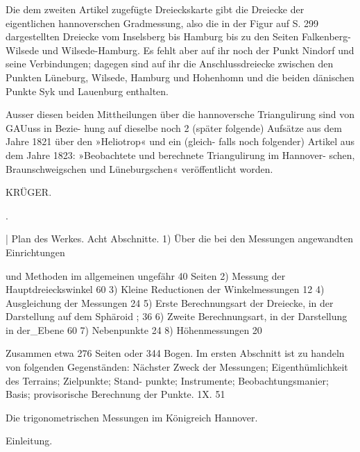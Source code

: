 \documentclass[12pt,a4paper]{article}
\theoremstyle{plain}
\theoremstyle{definition}
\theoremstyle{remark}
\begin{document}
\noindent
Die dem zweiten Artikel zugefügte Dreieckskarte gibt die Dreiecke der eigentlichen hannoverschen
Gradmessung, also die in der Figur auf S. 299 dargestellten Dreiecke vom Inselsberg bis Hamburg bis zu
den Seiten Falkenberg-Wilsede und Wilsede-Hamburg. Es fehlt aber auf ihr noch der Punkt Nindorf und
seine Verbindungen; dagegen sind auf ihr die Anschlussdreiecke zwischen den Punkten Lüneburg, Wilsede,
Hamburg und Hohenhomn und die beiden dänischen Punkte Syk und Lauenburg enthalten.

\noindent
Ausser diesen beiden Mittheilungen über die hannoversche Triangulirung sind von GAUuss in Bezie-
hung auf dieselbe noch 2 (später folgende) Aufsätze aus dem Jahre 1821 über den »Heliotrop« und ein (gleich-
falls noch folgender) Artikel aus dem Jahre 1823: »Beobachtete und berechnete Triangulirung im Hannover-
schen, Braunschweigschen und Lüneburgschen« veröffentlicht worden.

\noindent
KRÜGER.

\noindent

\noindent
.

\noindent

|
Plan des Werkes.
Acht Abschnitte.
1) Über die bei den Messungen angewandten Einrichtungen

\noindent
und Methoden im allgemeinen ungefähr 40 Seiten
2) Messung der Hauptdreieckswinkel 60
3) Kleine Reductionen der Winkelmessungen 12
4) Ausgleichung der Messungen 24
5) Erste Berechnungsart der Dreiecke, in der Darstellung
auf dem Sphäroid ; 36
6) Zweite Berechnungsart, in der Darstellung in der\_Ebene 60
7) Nebenpunkte 24
8) Höhenmessungen 20

\noindent
Zusammen etwa 276 Seiten
oder 344 Bogen.
Im ersten Abschnitt ist zu handeln von folgenden Gegenständen: Nächster
Zweck der Messungen; Eigenthümlichkeit des Terrains; Zielpunkte; Stand-
punkte; Instrumente; Beobachtungsmanier; Basis; provisorische Berechnung
der Punkte.
1X. 51

\noindent

\noindent
Die trigonometrischen Messungen im Königreich Hannover.

\noindent
Einleitung.
\end{document}
